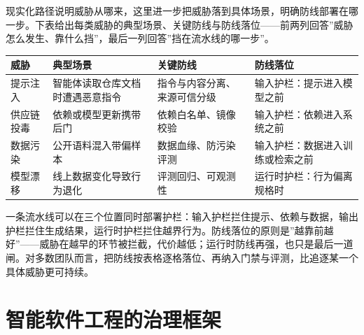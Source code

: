 \documentclass[
]{ctexbook}
\newcounter{none}
\begin{document}
现实化路径说明威胁从哪来，这里进一步把威胁落到具体场景，明确防线部署在哪一步。下表给出每类威胁的典型场景、关键防线与防线落位------前两列回答''威胁怎么发生、靠什么挡''，最后一列回答''挡在流水线的哪一步''。

{\def\LTcaptype{none} %
\begin{longtable}[]{@{}
  >{\raggedright\arraybackslash}p{}
  >{\raggedright\arraybackslash}p{}
  >{\raggedright\arraybackslash}p{}
  >{\raggedright\arraybackslash}p{}@{}}
\toprule\noalign{}
\begin{minipage}[b]{\linewidth}\raggedright
威胁
\end{minipage} & \begin{minipage}[b]{\linewidth}\raggedright
典型场景
\end{minipage} & \begin{minipage}[b]{\linewidth}\raggedright
关键防线
\end{minipage} & \begin{minipage}[b]{\linewidth}\raggedright
防线落位
\end{minipage} \\
\midrule\noalign{}
\endhead
\bottomrule\noalign{}
\endlastfoot
提示注入 & 智能体读取仓库文档时遭遇恶意指令 &
指令与内容分离、来源可信分级 & 输入护栏：提示进入模型之前 \\
供应链投毒 & 依赖或模型更新携带后门 & 依赖白名单、镜像校验 &
输入护栏：依赖进入系统之前 \\
数据污染 & 公开语料混入带偏样本 & 数据血缘、防污染评测 &
输入护栏：数据进入训练或检索之前 \\
模型漂移 & 线上数据变化导致行为退化 & 评测回归、可观测性 &
运行时护栏：行为偏离规格时 \\
\end{longtable}
}

一条流水线可以在三个位置同时部署护栏：输入护栏拦住提示、依赖与数据，输出护栏拦住生成结果，运行时护栏拦住越界行为。防线落位的原则是''越靠前越好''------威胁在越早的环节被拦截，代价越低；运行时防线再强，也只是最后一道闸。对多数团队而言，把防线按表格逐格落位、再纳入门禁与评测，比追逐某一个具体威胁更可持续。

\section{智能软件工程的治理框架}\label{ux667aux80fdux8f6fux4ef6ux5de5ux7a0bux7684ux6cbbux7406ux6846ux67b6}
\end{document}
